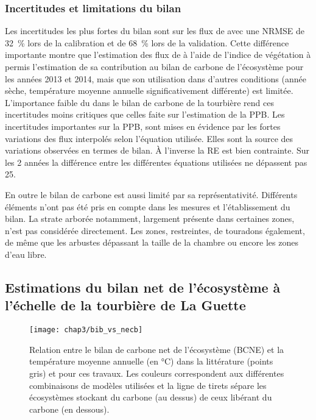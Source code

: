 \subsubsection{Incertitudes et limitations du bilan}
Les incertitudes les plus fortes du bilan sont sur les flux de \chh avec une NRMSE de \SI{32}{\percent} lors de la calibration et de \SI{68}{\percent} lors de la validation.
Cette différence importante montre que l'estimation des flux de \chh à l'aide de l'indice de végétation à permis l'estimation de sa contribution au bilan de carbone de l'écosystème pour les années 2013 et 2014, mais que son utilisation dans d'autres conditions (année sèche, température moyenne annuelle significativement différente) est limitée.
L'importance faible du \chh dans le bilan de carbone de la tourbière rend ces incertitudes moins critiques que celles faite sur l'estimation de la PPB.
Les incertitudes importantes sur la PPB, sont mises en évidence par les fortes variations des flux interpolés selon l'équation utilisée.
Elles sont la source des variations observées en termes de bilan.
À l'inverse la RE est bien contrainte.
Sur les 2 années la différence entre les différentes équations utilisées ne dépassent pas \SI{25}{\gcma}.

En outre le bilan de carbone est aussi limité par sa représentativité. 
Différents éléments n'ont pas été pris en compte dans les mesures et l'établissement du bilan.
La strate arborée notamment, largement présente dans certaines zones, n'est pas considérée directement.
Les zones, restreintes, de touradons également, de même que les arbustes dépassant la taille de la chambre ou encore les zones d'eau libre.

\subsection{Estimations du bilan net de l'écosystème à l'échelle de la tourbière de La Guette}

\begin{figure}
\centering
\texttt{[image: chap3/bib\_vs\_necb]}
\caption{Relation entre le bilan de carbone net de l'écosystème (BCNE) et la température moyenne annuelle (en °C) dans la littérature (points gris) et pour ces travaux.  Les couleurs correspondent aux différentes combinaisons de modèles utilisées et la ligne de tirets sépare les écosystèmes stockant du carbone (au dessus) de ceux libérant du carbone (en dessous).}
\label{fig:bib_vs_necb}
\end{figure}

